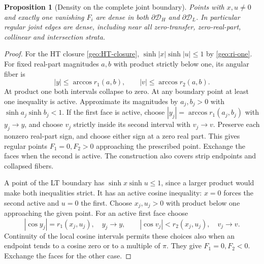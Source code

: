 \documentclass[11pt]{article}
\numberwithin{equation}{section}
\newtheorem{proposition}[theorem]{Proposition}
\theoremstyle{definition}
\begin{document}
\begin{proposition}[Density on the complete joint boundary]
\label{geo:joint-density}
Points with $x,u\ne0$ and exactly one vanishing $F_i$ are dense in
both $\partial\mathcal D_H$ and $\partial\mathcal D_L$.
In particular regular joint edges are dense, including near all
zero-transfer, zero-real-part, collinear and intersection strata.
\end{proposition}
\begin{proof}
For the HT closure \eqref{geo:HT-closure},
$\sinh|x|\sinh|u|\le1$ by \eqref{geo:ri-one}.  For fixed real-part
magnitudes $a,b$ with product strictly below one, its angular fiber is
\[
 |y|\le\arccos r_1(a,b),\qquad |v|\le\arccos r_2(a,b).
\]
At product one both intervals collapse to zero.  At any boundary point
at least one inequality is active.  Approximate its magnitudes by
$a_j,b_j>0$ with $\sinh a_j\sinh b_j<1$.  If the first face is active,
choose $|y_j|=\arccos r_1(a_j,b_j)$ with $y_j\to y$, and choose
$v_j$ strictly inside its second interval with $v_j\to v$.
Preserve each nonzero real-part sign, and choose either sign at a
zero real part.  This gives regular points $F_1=0,F_2>0$ approaching
the prescribed point.  Exchange the faces when the second is active.
The construction also covers strip endpoints and collapsed fibers.

A point of the LT boundary has $\sinh x\sinh u\le1$, since a larger
product would make both inequalities strict.  It has an active cosine
inequality: $x=0$ forces the second active and $u=0$ the first.
Choose $x_j,u_j>0$ with product below one approaching the given point.
For an active first face choose
\[
 |\cos y_j|=r_1(x_j,u_j),\quad y_j\to y,
 \qquad |\cos v_j|<r_2(x_j,u_j),\quad v_j\to v.
\]
Continuity of the local cosine intervals permits these choices also
when an endpoint tends to a cosine zero or to a multiple of $\pi$.
They give $F_1=0,F_2<0$.  Exchange the faces for the other case.
\end{proof}
\end{document}

